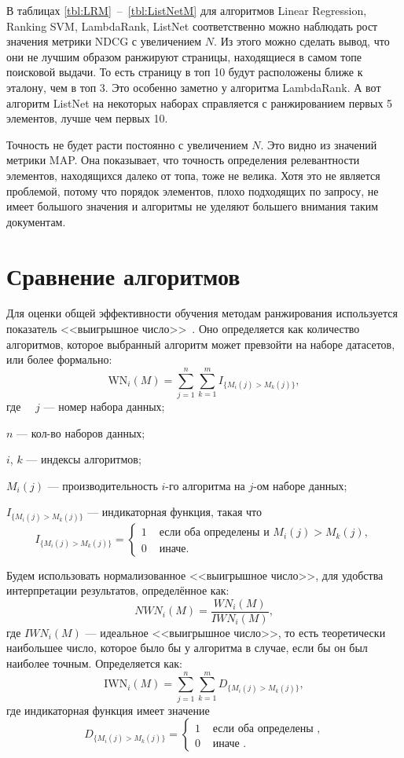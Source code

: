 В таблицах \ref{tbl:LRM}~--~\ref{tbl:ListNetM} для алгоритмов Linear Regression, Ranking SVM, LambdaRank, ListNet соответственно можно наблюдать рост значения метрики NDCG с увеличением $N$. Из этого можно сделать вывод, что они не лучшим образом ранжируют страницы, находящиеся в самом топе поисковой выдачи. То есть страницу в топ 10 будут расположены ближе к эталону, чем в топ 3. Это особенно заметно у алгоритма LambdaRank. А вот алгоритм ListNet на некоторых наборах справляется с ранжированием первых 5 элементов, лучше чем первых 10.

Точность не будет расти постоянно с увеличением $N$. Это видно из значений метрики MAP. Она показывает, что точность определения релевантности элементов, находящихся далеко от топа, тоже не велика. Хотя это не является проблемой, потому что порядок элементов, плохо подходящих по запросу, не имеет большого значения и алгоритмы не уделяют большего внимания таким документам.

\section{Сравнение алгоритмов}
Для оценки общей эффективности обучения методам ранжирования используется показатель <<выигрышное число>>~\cite{cmp}. Оно определяется как количество алгоритмов, которое выбранный алгоритм может превзойти на наборе датасетов, или более формально:
\begin{equation}
	\label{eq:wn1}
	\mathrm{WN}_i(M)=\sum_{j=1}^n \sum_{k=1}^m I_{\{M_i(j)>M_k(j)\}},
\end{equation}
где ~~$j$ --- номер набора данных;

$n$ --- кол-во наборов данных;

$i$, $k$ --- индексы алгоритмов;

$M_i(j)$ --- производительность $i$-го алгоритма на $j$-ом наборе данных;

$I_{\{M_i(j)>M_k(j)\}}$ --- индикаторная функция, такая что
\[
I_{\{M_i(j)>M_k(j)\}}= \begin{cases}1 & \text { если оба определены и } M_i(j)>M_k(j), \\ 0 & \text { иначе. }\end{cases}
\]

Будем использовать нормализованное <<выигрышное число>>, для удобства интерпретации результатов, определённое как:
\begin{equation}
	\label{eq:wn2}
	NWN_i(M)=\frac{WN_i(M)}{IWN_i(M)},
\end{equation}
где $IWN_i(M)$ --- идеальное <<выигрышное число>>, то есть теоретически наибольшее число, которое было
бы у алгоритма в случае, если бы он был наиболее точным. Определяется как:
\begin{equation}
	\label{eq:wn3}
	\mathrm{IWN}_i(M)=\sum_{j=1}^n \sum_{k=1}^m D_{\{M_i(j)>M_k(j)\}},
\end{equation}
где индикаторная функция имеет значение
\[
D_{\{M_i(j)>M_k(j)\}}= \begin{cases}1 & \text { если оба определены }, \\ 0 & \text { иначе }.\end{cases}
\]

